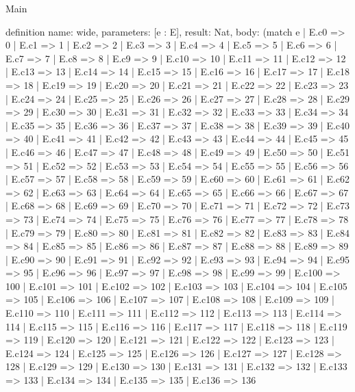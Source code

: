 \begin{lexlean}{Main}
\begin{semanticmodule}
definition{
  name: wide,
  parameters: [e : E],
  result: Nat,
  body: (match e
    | E.c0 => 0
    | E.c1 => 1
    | E.c2 => 2
    | E.c3 => 3
    | E.c4 => 4
    | E.c5 => 5
    | E.c6 => 6
    | E.c7 => 7
    | E.c8 => 8
    | E.c9 => 9
    | E.c10 => 10
    | E.c11 => 11
    | E.c12 => 12
    | E.c13 => 13
    | E.c14 => 14
    | E.c15 => 15
    | E.c16 => 16
    | E.c17 => 17
    | E.c18 => 18
    | E.c19 => 19
    | E.c20 => 20
    | E.c21 => 21
    | E.c22 => 22
    | E.c23 => 23
    | E.c24 => 24
    | E.c25 => 25
    | E.c26 => 26
    | E.c27 => 27
    | E.c28 => 28
    | E.c29 => 29
    | E.c30 => 30
    | E.c31 => 31
    | E.c32 => 32
    | E.c33 => 33
    | E.c34 => 34
    | E.c35 => 35
    | E.c36 => 36
    | E.c37 => 37
    | E.c38 => 38
    | E.c39 => 39
    | E.c40 => 40
    | E.c41 => 41
    | E.c42 => 42
    | E.c43 => 43
    | E.c44 => 44
    | E.c45 => 45
    | E.c46 => 46
    | E.c47 => 47
    | E.c48 => 48
    | E.c49 => 49
    | E.c50 => 50
    | E.c51 => 51
    | E.c52 => 52
    | E.c53 => 53
    | E.c54 => 54
    | E.c55 => 55
    | E.c56 => 56
    | E.c57 => 57
    | E.c58 => 58
    | E.c59 => 59
    | E.c60 => 60
    | E.c61 => 61
    | E.c62 => 62
    | E.c63 => 63
    | E.c64 => 64
    | E.c65 => 65
    | E.c66 => 66
    | E.c67 => 67
    | E.c68 => 68
    | E.c69 => 69
    | E.c70 => 70
    | E.c71 => 71
    | E.c72 => 72
    | E.c73 => 73
    | E.c74 => 74
    | E.c75 => 75
    | E.c76 => 76
    | E.c77 => 77
    | E.c78 => 78
    | E.c79 => 79
    | E.c80 => 80
    | E.c81 => 81
    | E.c82 => 82
    | E.c83 => 83
    | E.c84 => 84
    | E.c85 => 85
    | E.c86 => 86
    | E.c87 => 87
    | E.c88 => 88
    | E.c89 => 89
    | E.c90 => 90
    | E.c91 => 91
    | E.c92 => 92
    | E.c93 => 93
    | E.c94 => 94
    | E.c95 => 95
    | E.c96 => 96
    | E.c97 => 97
    | E.c98 => 98
    | E.c99 => 99
    | E.c100 => 100
    | E.c101 => 101
    | E.c102 => 102
    | E.c103 => 103
    | E.c104 => 104
    | E.c105 => 105
    | E.c106 => 106
    | E.c107 => 107
    | E.c108 => 108
    | E.c109 => 109
    | E.c110 => 110
    | E.c111 => 111
    | E.c112 => 112
    | E.c113 => 113
    | E.c114 => 114
    | E.c115 => 115
    | E.c116 => 116
    | E.c117 => 117
    | E.c118 => 118
    | E.c119 => 119
    | E.c120 => 120
    | E.c121 => 121
    | E.c122 => 122
    | E.c123 => 123
    | E.c124 => 124
    | E.c125 => 125
    | E.c126 => 126
    | E.c127 => 127
    | E.c128 => 128
    | E.c129 => 129
    | E.c130 => 130
    | E.c131 => 131
    | E.c132 => 132
    | E.c133 => 133
    | E.c134 => 134
    | E.c135 => 135
    | E.c136 => 136
}
\end{semanticmodule}
\end{lexlean}
